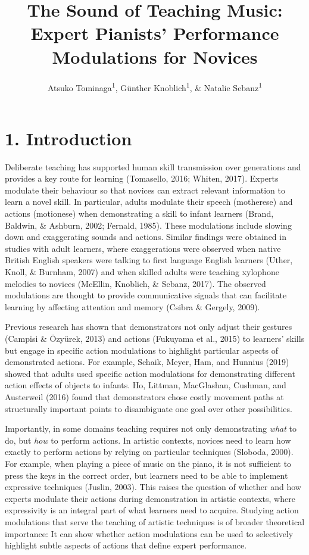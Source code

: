 \documentclass[
  english,
  man,floatsintext]{apa6}
\author{Atsuko Tominaga\textsuperscript{1}, Günther Knoblich\textsuperscript{1}, \& Natalie Sebanz\textsuperscript{1}}
\affiliation{
\vspace{0.5cm}
\textsuperscript{1} Department of Cognitive Science, Central European University}
\title{The Sound of Teaching Music: Expert Pianists' Performance Modulations for Novices}
\date{}
\begin{document}
\maketitle

\hypertarget{introduction}{%
\section{1. Introduction}\label{introduction}}

Deliberate teaching has supported human skill transmission over generations and provides a key route for learning (Tomasello, 2016; Whiten, 2017). Experts modulate their behaviour so that novices can extract relevant information to learn a novel skill. In particular, adults modulate their speech (motherese) and actions (motionese) when demonstrating a skill to infant learners (Brand, Baldwin, \& Ashburn, 2002; Fernald, 1985). These modulations include slowing down and exaggerating sounds and actions. Similar findings were obtained in studies with adult learners, where exaggerations were observed when native British English speakers were talking to first language English learners (Uther, Knoll, \& Burnham, 2007) and when skilled adults were teaching xylophone melodies to novices (McEllin, Knoblich, \& Sebanz, 2017). The observed modulations are thought to provide communicative signals that can facilitate learning by affecting attention and memory (Csibra \& Gergely, 2009).

Previous research has shown that demonstrators not only adjust their gestures (Campisi \& Özyürek, 2013) and actions (Fukuyama et al., 2015) to learners' skills but engage in specific action modulations to highlight particular aspects of demonstrated actions. For example, Schaik, Meyer, Ham, and Hunnius (2019) showed that adults used specific action modulations for demonstrating different action effects of objects to infants. Ho, Littman, MacGlashan, Cushman, and Austerweil (2016) found that demonstrators chose costly movement paths at structurally important points to disambiguate one goal over other possibilities.

Importantly, in some domains teaching requires not only demonstrating \emph{what} to do, but \emph{how} to perform actions. In artistic contexts, novices need to learn how exactly to perform actions by relying on particular techniques (Sloboda, 2000). For example, when playing a piece of music on the piano, it is not sufficient to press the keys in the correct order, but learners need to be able to implement expressive techniques (Juslin, 2003). This raises the question of whether and how experts modulate their actions during demonstration in artistic contexts, where expressivity is an integral part of what learners need to acquire. Studying action modulations that serve the teaching of artistic techniques is of broader theoretical importance: It can show whether action modulations can be used to selectively highlight subtle aspects of actions that define expert performance.
\end{document}
